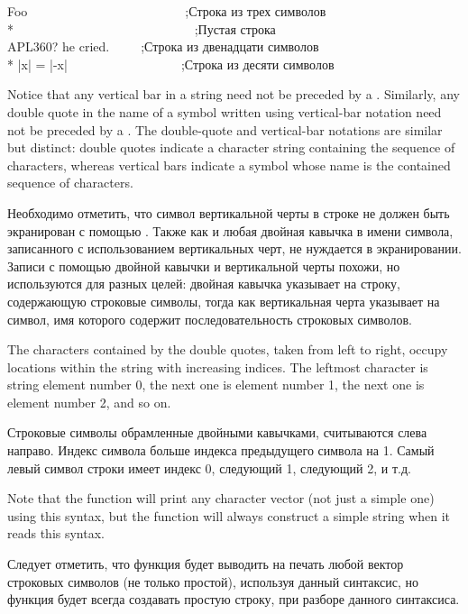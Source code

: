 \begin{lisp}
{\Xdquote}Foo{\Xdquote}~~~~~~~~~~~~~~~~~~~~~~~~~;\textrm{Строка из трех символов} \\*
{\Xdquote}{\Xdquote}~~~~~~~~~~~~~~~~~~~~~~~~~~~~;\textrm{Пустая строка} \\
{\Xdquote}{\Xbackslash}{\Xdquote}APL{\Xbackslash}{\Xbackslash}360?{\Xbackslash}{\Xdquote} he
cried.{\Xdquote}~~~~~;\textrm{Строка из двенадцати символов} \\*
{\Xdquote}|x| = |-x|{\Xdquote}~~~~~~~~~~~~~~~~~~;\textrm{Строка из десяти символов}
\end{lisp}
Notice that any vertical bar \cd{|} in a string need not be
preceded by a \cd{{\Xbackslash}}.  Similarly, any double quote in the name
of a symbol written using vertical-bar notation need not be
preceded by a \cd{{\Xbackslash}}.  The double-quote and vertical-bar notations
are similar but distinct: double quotes indicate a character string
containing the sequence of characters,
whereas vertical bars indicate a symbol whose name is the contained
sequence of characters.

Необходимо отметить, что символ вертикальной черты \cd{|} в строке не должен быть
экранирован с помощью \cd{{\Xbackslash}}. Также как и любая двойная кавычка в имени
символа, записанного с использованием вертикальных черт, не нуждается в
экранировании. Записи с помощью двойной кавычки и вертикальной черты похожи, но
используются для разных целей: двойная кавычка указывает на строку, содержающую
строковые символы, тогда как вертикальная черта указывает на символ, имя
которого содержит последовательность строковых символов.

The characters contained by the double quotes, taken from left to right,
occupy locations within the string with increasing indices.
The leftmost character is string element number 0, the next one
is element number 1, the next one is element number 2, and so on.

Строковые символы обрамленные двойными кавычками, считываются слева
направо. Индекс символа больше индекса предыдущего символа на 1. Самый левый
символ строки имеет индекс 0, следующий 1, следующий 2, и т.д.

Note that the function  will print any character vector
(not just a simple one)
using this syntax, but the function  will always construct
a simple string when it reads this syntax.

Следует отметить, что функция  будет выводить на печать любой вектор
строковых символов (не только простой), используя данный синтаксис, но функция
 будет всегда создавать простую строку, при разборе данного синтаксиса.

